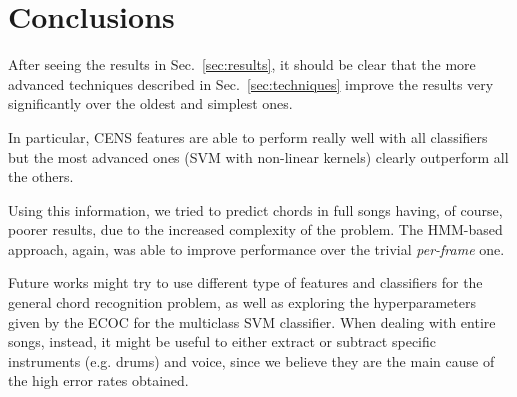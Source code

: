 \section{Conclusions}
\label{sec:conclusions}

After seeing the results in Sec.~\ref{sec:results}, it should be clear that the more advanced techniques described in Sec.~\ref{sec:techniques} improve the results very significantly over the oldest and simplest ones.

In particular, CENS features are able to perform really well with all classifiers but the most advanced ones (SVM with non-linear kernels) clearly outperform all the others.

Using this information, we tried to predict chords in full songs having, of course, poorer results, due to the increased complexity of the problem. The HMM-based approach, again, was able to improve performance over the trivial \textit{per-frame} one.

Future works might try to use different type of features and classifiers for the general chord recognition problem, as well as exploring the hyperparameters given by the ECOC for the multiclass SVM classifier. When dealing with entire songs, instead, it might be useful to either extract or subtract specific instruments (e.g. drums) and voice, since we believe they are the main cause of the high error rates obtained.